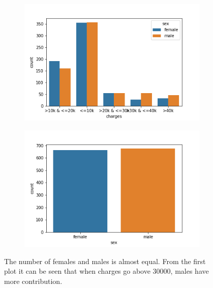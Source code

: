 \documentclass[12pt]{article}
\begin{document}
\begin{figure}[H]
\centering
\begin{subfigure}{0.5\textwidth}
\includegraphics[width=\textwidth]{sex.png}
\end{subfigure}
\begin{subfigure}{0.5\textwidth}
\includegraphics[width=\textwidth]{sex_dist.png}
\end{subfigure}
\label{mesh:fig1}
\caption{The number of females and males is almost equal. From the first plot it can be seen that when charges go above 30000, males have more contribution.}
\end{figure}
\end{document}
